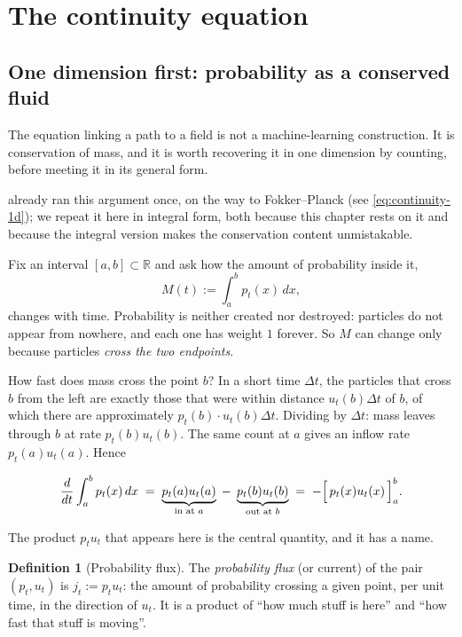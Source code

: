 \documentclass[11pt,a4paper]{report}
\theoremstyle{definition}
\newtheorem{definition}[definition]{Definition}
\theoremstyle{remark}
\newcommand{\RR}{\mathbb R}
\begin{document}
\section{The continuity equation}
\label{sec:fm-continuity}

\subsection{One dimension first: probability as a conserved fluid}
\label{sec:continuity-1d}

The equation linking a path to a field is not a machine-learning
construction. It is conservation of mass, and it is worth recovering it in
one dimension by counting, before meeting it in its general form.

 already ran this argument once, on the way to
Fokker--Planck (see \eqref{eq:continuity-1d}); we repeat it here in
integral form, both because this chapter rests on it and because the
integral version makes the conservation content unmistakable.

Fix an interval $[a,b]\subset\RR$ and ask how the amount of probability
inside it,
\[
M(t) := \int_a^b p_t(x)\,dx ,
\]
changes with time. Probability is neither created nor destroyed: particles
do not appear from nowhere, and each one has weight $1$ forever. So $M$ can
change only because particles \emph{cross the two endpoints}.

How fast does mass cross the point $b$? In a short time $\Delta t$, the
particles that cross $b$ from the left are exactly those that were within
distance $u_t(b)\Delta t$ of $b$, of which there are approximately
$p_t(b)\cdot u_t(b)\Delta t$. Dividing by $\Delta t$: mass leaves through
$b$ at rate $p_t(b)u_t(b)$. The same count at $a$ gives an inflow rate
$p_t(a)u_t(a)$. Hence

\begin{equation}
\label{eq:continuity-integral}
\frac{d}{dt}\int_a^b p_t(x)\,dx
\;=\;
\underbrace{p_t(a)u_t(a)}_{\text{in at }a}
\;-\;
\underbrace{p_t(b)u_t(b)}_{\text{out at }b}
\;=\;
-\Bigl[\,p_t(x)u_t(x)\,\Bigr]_{a}^{b} .
\end{equation}

The product $p_tu_t$ that appears here is the central quantity, and it has a
name.

\begin{definition}[Probability flux]
\label{def:flux}
The \emph{probability flux} (or current) of the pair $(p_t,u_t)$ is
$j_t := p_tu_t$: the amount of probability crossing a given point, per unit
time, in the direction of $u_t$. It is a product of ``how much stuff is
here'' and ``how fast that stuff is moving''.
\end{definition}
\end{document}
